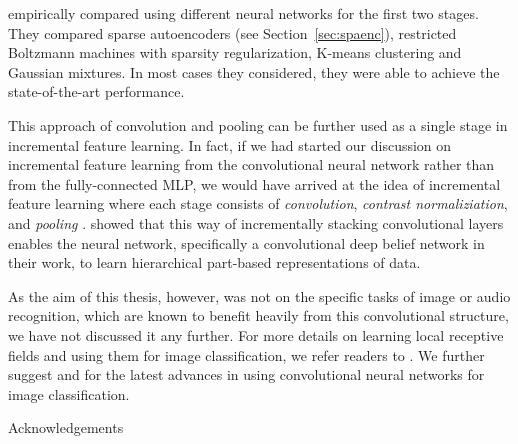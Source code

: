 \documentclass{now}
\begin{document}
\citet{Coates2011} empirically compared using different
neural networks for the first two stages. They compared
sparse autoencoders (see Section~\ref{sec:spaenc}),
restricted Boltzmann machines with sparsity
regularization, K-means clustering and Gaussian mixtures. In
most cases they considered, they were able to achieve the
state-of-the-art performance.

This approach of convolution and pooling can be further used
as a single stage in incremental feature learning.  In
fact, if we had started our discussion on incremental
feature learning from the convolutional neural
network \citep[see, e.g.,][]{Lecun1998} rather than from the
fully-connected MLP, we would have arrived at the idea of
incremental feature learning where each stage consists of
\textit{convolution}, \textit{contrast normaliziation}, and
\textit{pooling} \citep[see, e.g.,][]{Lecun2010}. \citet{Lee2009} showed that this way of
incrementally stacking convolutional layers enables the
neural network, specifically a convolutional deep belief
network in their work, to learn hierarchical part-based
representations of data.

As the aim of this thesis, however, was not on the specific
tasks of image or audio recognition, which are known to
benefit heavily from this convolutional structure, we have
not discussed it any further. For more details on learning
local receptive fields and using them for image
classification, we refer readers to \citep{Coates2012t}. We
further suggest \citep{Krizhevsky2012} and
\citep{Ciresan2012b} for the latest advances in using
convolutional neural networks for image classification.

\begin{acknowledgements}
    Acknowledgements
\end{acknowledgements}

%

\backmatter


\end{document}
